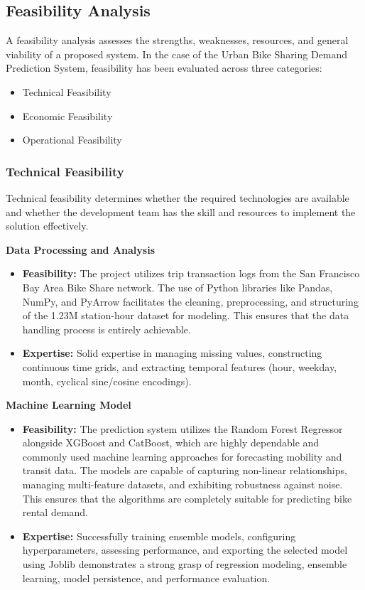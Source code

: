 \documentclass[12pt, a4paper]{article}
\renewcommand{\_}{\textunderscore\allowbreak}
\begin{document}
\subsection{Feasibility Analysis}

A feasibility analysis assesses the strengths, weaknesses, resources, and general viability of a proposed system. In the case of the Urban Bike Sharing Demand Prediction System, feasibility has been evaluated across three categories:
\begin{itemize}
    \item Technical Feasibility
    \item Economic Feasibility
    \item Operational Feasibility
\end{itemize}

\subsubsection{Technical Feasibility}

Technical feasibility determines whether the required technologies are available and whether the development team has the skill and resources to implement the solution effectively.

\noindent \textbf{Data Processing and Analysis}
\begin{itemize}
    \item \textbf{Feasibility:} The project utilizes trip transaction logs from the San Francisco Bay Area Bike Share network. The use of Python libraries like Pandas, NumPy, and PyArrow facilitates the cleaning, preprocessing, and structuring of the 1.23M station-hour dataset for modeling. This ensures that the data handling process is entirely achievable.
    \item \textbf{Expertise:} Solid expertise in managing missing values, constructing continuous time grids, and extracting temporal features (hour, weekday, month, cyclical sine/cosine encodings).
\end{itemize}

\noindent \textbf{Machine Learning Model}
\begin{itemize}
    \item \textbf{Feasibility:} The prediction system utilizes the Random Forest Regressor alongside XGBoost and CatBoost, which are highly dependable and commonly used machine learning approaches for forecasting mobility and transit data. The models are capable of capturing non-linear relationships, managing multi-feature datasets, and exhibiting robustness against noise. This ensures that the algorithms are completely suitable for predicting bike rental demand.
    \item \textbf{Expertise:} Successfully training ensemble models, configuring hyperparameters, assessing performance, and exporting the selected model using Joblib demonstrates a strong grasp of regression modeling, ensemble learning, model persistence, and performance evaluation.
\end{itemize}
\end{document}
